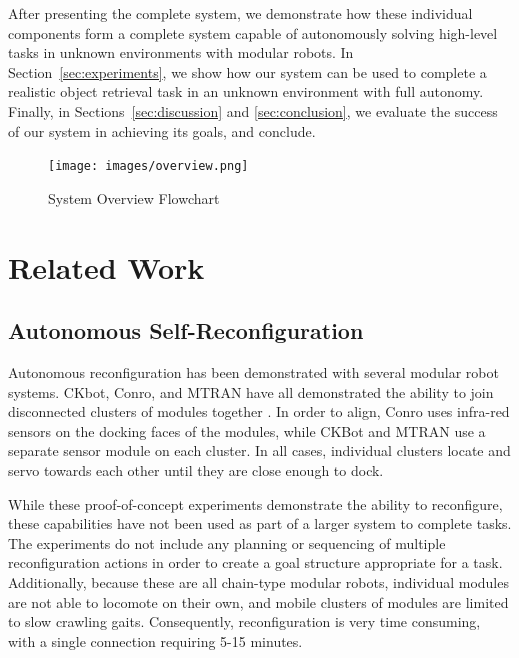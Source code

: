 \documentclass[conference]{IEEEtran}
\begin{document}
After presenting the complete system, we demonstrate how these individual components form a complete system capable of autonomously solving high-level tasks in unknown environments with modular robots.  In Section~\ref{sec:experiments}, we show how our system can be used to complete a realistic object retrieval task in an unknown environment with full autonomy.  Finally, in Sections~\ref{sec:discussion} and \ref{sec:conclusion}, we evaluate the success of our system in achieving its goals, and conclude.
%
\begin{figure}
\begin{center}
\texttt{[image: images/overview.png]}
\caption{System Overview Flowchart}
\label{fig:overview}
\end{center}
\end{figure} 
%

\section{Related Work}\label{sec:related-work}
\subsection{Autonomous Self-Reconfiguration}
\label{autonomous-self-reconfiguration}
%
Autonomous reconfiguration has been demonstrated with several modular robot systems. CKbot, Conro, and MTRAN have all demonstrated the ability to join disconnected clusters of modules together \cite{Yim2007, Rubenstein2004,Murata2006}. In order to align, Conro uses infra-red sensors on the docking faces of the modules, while CKBot and MTRAN use a separate sensor module on each cluster.  In all cases, individual clusters locate and servo towards each other until they are close enough to dock.

While these proof-of-concept experiments demonstrate the ability to reconfigure, these capabilities have not been used as part of a larger system to complete tasks. The experiments do not include any planning or sequencing of multiple reconfiguration actions in order to create a goal structure appropriate for a task.  Additionally, because these are all chain-type modular robots, individual modules are not able to locomote on their own, and mobile clusters of modules are limited to slow crawling gaits.  Consequently, reconfiguration is very time consuming, with a single connection requiring 5-15 minutes.
\end{document}
